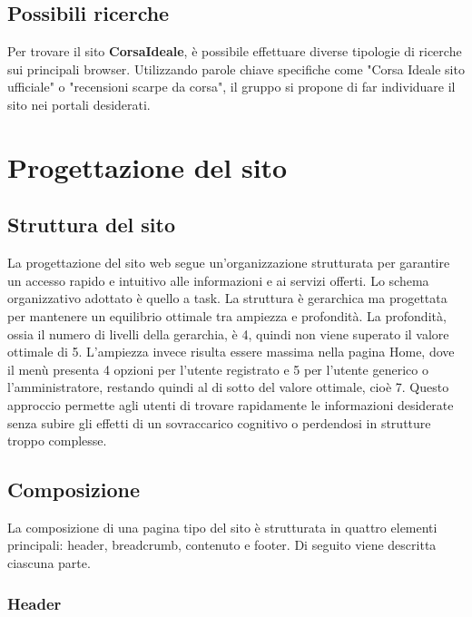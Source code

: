 \documentclass[a4paper, 12pt]{article}
\begin{document}
\begin{justify}
\subsection{Possibili ricerche}
Per trovare il sito \textbf{CorsaIdeale}, è possibile effettuare diverse tipologie di ricerche sui principali browser. Utilizzando parole chiave specifiche come "Corsa Ideale sito ufficiale" o "recensioni scarpe da corsa", il gruppo si propone di far individuare il sito nei portali desiderati.

\section{Progettazione del sito}

\subsection{Struttura del sito}

La progettazione del sito web segue un'organizzazione strutturata per garantire un accesso rapido e intuitivo alle informazioni e ai servizi offerti. Lo schema organizzativo adottato è quello a task. La struttura è gerarchica ma progettata per mantenere un equilibrio ottimale tra ampiezza e profondità. La profondità, ossia il numero di livelli della gerarchia, è 4, quindi non viene superato il valore ottimale di 5. L'ampiezza invece risulta essere massima nella pagina Home, dove il menù presenta 4 opzioni per l'utente registrato e 5 per l'utente generico o l'amministratore, restando quindi al di sotto del valore ottimale, cioè 7. Questo approccio permette agli utenti di trovare rapidamente le informazioni desiderate senza subire gli effetti di un sovraccarico cognitivo o perdendosi in strutture troppo complesse.

\subsection{Composizione}

La composizione di una pagina tipo del sito è strutturata in quattro elementi principali: header, breadcrumb, contenuto e footer. Di seguito viene descritta ciascuna parte.

\subsubsection{Header}


\end{justify}
\end{document}
